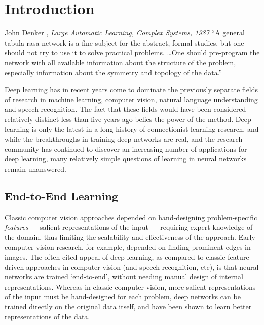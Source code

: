 \documentclass[thesis]{subfiles}
\begin{document}

\chapter{Introduction}  %
\begin{chapquote}{John Denker \etal, \textit{Large Automatic Learning, Complex Systems, 1987}}
	``A general tabula rasa network is a fine subject for the abstract, formal studies, but one should not try to use it to solve practical problems. \ldots One should pre-program the network with all available information about the structure of the problem, especially information about the symmetry and topology of the data.''
\end{chapquote}
Deep learning has in recent years come to dominate the previously separate fields of research in machine learning, computer vision, natural language understanding and speech recognition. The fact that these fields would have been considered relatively distinct less than five years ago belies the power of the method. Deep learning is only the latest in a long history of connectionist learning research, and while the breakthroughs in training deep networks are real, and the research community has continued to discover an increasing number of applications for deep learning, many relatively simple questions of learning in neural networks remain unanswered. %

\section{End-to-End Learning}
Classic computer vision approaches depended on hand-designing problem-specific \emph{features} --- salient representations of the input --- requiring expert knowledge of the domain, thus limiting the scalability and effectiveness of the approach. Early computer vision research, for example, depended on finding prominent edges in images. The often cited appeal of deep learning, as compared to classic feature-driven approaches in computer vision (and speech recognition, etc), is that neural networks are trained `end-to-end', \ie without needing manual design of internal representations. Whereas in classic computer vision, more salient representations of the input must be hand-designed for each problem, deep networks can be trained directly on the original data itself, and have been shown to learn better representations of the data.
\end{document}
